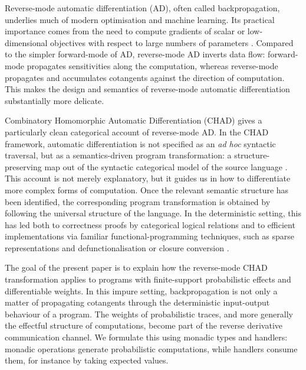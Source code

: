 \documentclass[11pt,a4paper]{article}
\theoremstyle{definition}
\theoremstyle{remark}
\begin{document}
Reverse-mode automatic differentiation (AD), often called
backpropagation, underlies much of modern optimisation and machine learning.
Its practical importance comes from the need to compute gradients of scalar or
low-dimensional objectives with respect to large numbers of parameters
\cite{baydinAutomaticDifferentiationMachine2018}.
Compared to the simpler forward-mode of AD, reverse-mode AD inverts data flow:
forward-mode propagates
sensitivities along the computation, whereas reverse-mode propagates and
accumulates cotangents against the direction of computation. This makes the
design and semantics of reverse-mode automatic differentiation substantially
more delicate.

Combinatory Homomorphic Automatic Differentiation (CHAD) gives a particularly
clean categorical account of reverse-mode AD. In the CHAD framework, automatic
differentiation is not specified as an \emph{ad hoc} syntactic traversal, but
as a semantics-driven program transformation: a structure-preserving map out of
the syntactic categorical model of the source language
\cite{lucatellinunesCHADExpressiveTotal2023,
	lucatellinunesUnravelingIterativeCHAD2025}. This account is not merely
explanatory, but it guides us in how to differentiate more complex forms of computation.
Once the relevant semantic structure has been
identified, the corresponding program transformation is obtained by following
the universal structure of the language. In the deterministic setting, this has
led both to correctness proofs by categorical logical relations and to efficient
implementations via familiar functional-programming techniques, such as
sparse representations and defunctionalisation or closure
conversion \cite{smedingEfficientCHAD2024}.

The goal of the present paper is to explain how the reverse-mode CHAD transformation
applies to programs with finite-support probabilistic effects and differentiable
weights. In this impure setting, backpropagation is not only a matter of propagating
cotangents through the deterministic input-output behaviour of a program. The
weights of probabilistic traces, and more generally the effectful structure of
 computations, become part of the reverse derivative communication
channel. We formulate this using monadic types and handlers: monadic operations
generate probabilistic computations, while handlers consume them, for instance
by taking expected values.
\end{document}
